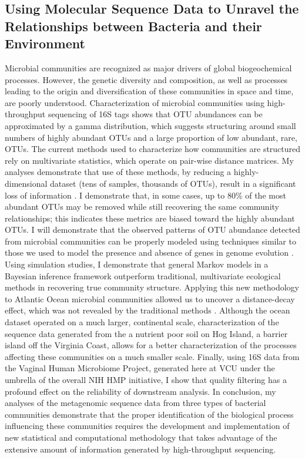 
\subsection*{Using Molecular Sequence Data to Unravel the Relationships between Bacteria 
and their Environment}

Microbial communities are recognized as major drivers of global biogeochemical processes.  However, 
the genetic diversity and composition, as well as processes leading to the origin and diversification of these 
communities in space and time, are poorly understood.  Characterization of microbial communities using 
high-throughput sequencing of 16S tags shows that OTU abundances can be approximated by a gamma distribution, 
which suggests structuring around small numbers of highly abundant OTUs and a large proportion of low abundant, 
rare, OTUs.  The current methods used to characterize how communities are structured rely on multivariate statistics, 
which operate on pair-wise distance matrices.  My analyses demonstrate that use of these methods, by reducing a 
highly-dimensional dataset (tens of samples, thousands of OTUs), result in a significant loss of information 
\citep{Friedline:2012fm}. I demonstrate that, in some cases, up to 80\% of the most abundant OTUs may be removed while 
still recovering the same community relationships; this indicates these metrics are biased toward the highly abundant OTUs.  I 
will demonstrate that the observed patterns of OTU abundance detected from microbial communities can be properly 
modeled using techniques similar to those we used to model the presence and absence of genes in genome 
evolution \citep{Lake:2004cy, Rivera:2004ct}.  Using simulation studies, I demonstrate that general Markov models 
in a Bayesian inference framework outperform traditional, multivariate ecological methods in recovering true community 
structure.  Applying this new methodology to Atlantic Ocean microbial communities allowed us to uncover a distance-decay 
effect, which was not revealed by the traditional methods \citep{Friedline:2012fm}.  Although the ocean dataset operated on a 
much larger, continental scale, characterization of the sequence data generated from the a nutrient poor soil on Hog Island, 
a barrier island off the Virginia Coast, allows for a better characterization of the processes affecting these communities 
on a much smaller scale.  Finally, using 16S data from the Vaginal Human 
Microbiome Project, generated here at VCU under the umbrella of the overall NIH HMP initiative, I show that 
quality filtering has a profound effect on the reliability of downstream analysis.  In conclusion, 
my analyses of the metagenomic sequence data from three types of bacterial communities demonstrate that the proper 
identification of the biological process influencing these communities requires the development and implementation of 
new statistical and computational methodology that takes advantage of the extensive amount of information generated by 
high-throughput sequencing. 

